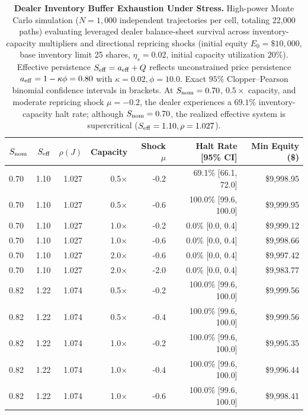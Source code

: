 \begin{table}[htbp]
\centering\footnotesize
\setlength{\tabcolsep}{3.5pt}
\caption{\textbf{Dealer Inventory Buffer Exhaustion Under Stress.}
High-power Monte Carlo simulation ($N = 1{,}000$ independent trajectories per cell, totaling 22,000 paths) evaluating leveraged dealer balance-sheet survival across inventory-capacity multipliers and directional repricing shocks (initial equity $E_0 = \$10{,}000$, base inventory limit 25 shares, $\eta_s=0.02$, initial capacity utilization $20\%$). Effective persistence $S_{\rm eff} = a_{\rm eff} + Q$ reflects unconstrained price persistence $a_{\rm eff} = 1 - \kappa\phi = 0.80$ with $\kappa=0.02, \phi=10.0$. Exact $95\%$ Clopper--Pearson binomial confidence intervals in brackets. At $S_{\rm nom}=0.70$, $0.5\times$ capacity, and moderate repricing shock $\mu=-0.2$, the dealer experiences a $69.1\%$ inventory-capacity halt rate; although $S_{\rm nom} = 0.70$, the realized effective system is supercritical ($S_{\rm eff} = 1.10, \rho = 1.027$).}
\label{tab:funded_risk_surface}
\begin{tabular}{lrrrrrr}\toprule
$S_{\rm nom}$ & $S_{\rm eff}$ & $\rho(J)$ & Capacity & Shock $\mu$ & Halt Rate [95\% CI] & Min Equity (\$) \\\midrule
0.70 & 1.10 & 1.027 & 0.5$\times$ & -0.2 & 69.1\% [66.1, 72.0] & \$9,998.95 \\
0.70 & 1.10 & 1.027 & 0.5$\times$ & -0.6 & 100.0\% [99.6, 100.0] & \$9,999.95 \\
0.70 & 1.10 & 1.027 & 1.0$\times$ & -0.2 & 0.0\% [0.0, 0.4] & \$9,999.12 \\
0.70 & 1.10 & 1.027 & 1.0$\times$ & -0.6 & 0.0\% [0.0, 0.4] & \$9,998.66 \\
0.70 & 1.10 & 1.027 & 2.0$\times$ & -0.6 & 0.0\% [0.0, 0.4] & \$9,997.42 \\
0.70 & 1.10 & 1.027 & 2.0$\times$ & -2.0 & 0.0\% [0.0, 0.4] & \$9,983.77 \\
\midrule
0.82 & 1.22 & 1.074 & 0.5$\times$ & -0.2 & 100.0\% [99.6, 100.0] & \$9,999.56 \\
0.82 & 1.22 & 1.074 & 0.5$\times$ & -0.4 & 100.0\% [99.6, 100.0] & \$9,999.56 \\
0.82 & 1.22 & 1.074 & 1.0$\times$ & -0.2 & 100.0\% [99.6, 100.0] & \$9,995.35 \\
0.82 & 1.22 & 1.074 & 1.0$\times$ & -0.4 & 100.0\% [99.6, 100.0] & \$9,996.44 \\
0.82 & 1.22 & 1.074 & 1.0$\times$ & -0.6 & 100.0\% [99.6, 100.0] & \$9,998.41 \\

\end{tabular}
\end{table}
